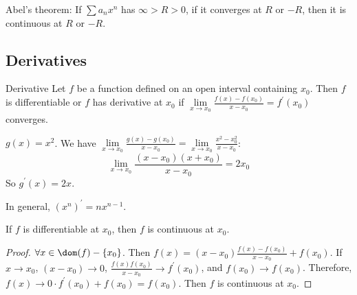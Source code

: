 \documentclass{report}
\begin{document}
Abel's theorem: If $\sum a_{n}x^{n}$ has $\infty > R > 0$, if it converges at $R$ or $-R$, then it is continuous at $R$ or $-R$.

\begin{topic}
    \section{Derivatives}
\end{topic}

\begin{definition}{Derivative}
    Let $f$ be a function defined on an open interval containing $x_{0}$. Then $f$ is differentiable or $f$ has derivative at $x_{0}$ if $\lim\limits_{x \to x_{0}}\frac{f(x) - f(x_{0})}{x - x_{0}} = f^{\prime}(x_{0})$ converges.
\end{definition} 

\begin{examples}
    \begin{example}
        $g(x) = x^{2}$. We have $\lim\limits_{x \to x_{0}}\frac{g(x) - g(x_{0})}{x - x_{0}} = \lim\limits_{x \to x_{0}}\frac{x^{2} - x_{0}^{2}}{x - x_{0}}$:
            \begin{equation*}
                \lim\limits_{x \to x_{0}}\dfrac{(x - x_{0})(x + x_{0})}{x - x_{0}} = 2x_{0}
            \end{equation*}
        So $g^{\prime}(x) = 2x$. 
    \end{example}
\end{examples}

In general, $(x^{n})^{\prime} = nx^{n - 1}$.

\begin{theorem}{28.2}
    If $f$ is differentiable at $x_{0}$, then $f$ is continuous at $x_{0}$.
\end{theorem}
    \begin{proof}
        $\forall x \in \dom (f) - \{x_{0}\}$. Then $f(x) = (x - x_{0})\frac{f(x) - f(x_{0})}{x - x_{0}} + f(x_{0})$. If $x \rightarrow x_{0}$, $(x - x_{0}) \rightarrow 0$, $\frac{f(x)  f(x_{0})}{x - x_{0}} \rightarrow f^{\prime}(x_{0})$, and $f(x_{0}) \rightarrow f(x_{0})$. Therefore, $f(x) \rightarrow 0 \cdot f^{\prime}(x_{0}) + f(x_{0}) = f(x_{0})$. Then $f$ is continuous at $x_{0}$.
    \end{proof}
\end{document}
